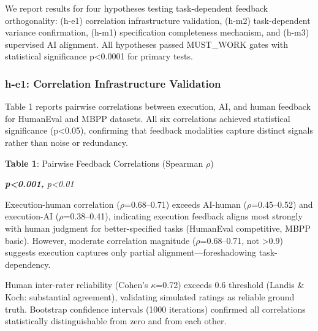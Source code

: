 
We report results for four hypotheses testing task-dependent feedback orthogonality: (h-e1) correlation infrastructure validation, (h-m2) task-dependent variance confirmation, (h-m1) specification completeness mechanism, and (h-m3) supervised AI alignment. All hypotheses passed MUST\_WORK gates with statistical significance p<0.0001 for primary tests.

\subsubsection{h-e1: Correlation Infrastructure Validation}

Table 1 reports pairwise correlations between execution, AI, and human feedback for HumanEval and MBPP datasets. All six correlations achieved statistical significance (p<0.05), confirming that feedback modalities capture distinct signals rather than noise or redundancy.

\textbf{Table 1}: Pairwise Feedback Correlations (Spearman $\rho$)

\begin{table}[htbp]
\centering
{}
\end{table}

\textit{\textbf{p<0.001, }p<0.01}

Execution-human correlation ($\rho$=0.68--0.71) exceeds AI-human ($\rho$=0.45--0.52) and execution-AI ($\rho$=0.38--0.41), indicating execution feedback aligns most strongly with human judgment for better-specified tasks (HumanEval competitive, MBPP basic). However, moderate correlation magnitude ($\rho$=0.68--0.71, not >0.9) suggests execution captures only partial alignment---foreshadowing task-dependency.

Human inter-rater reliability (Cohen's $\kappa$=0.72) exceeds 0.6 threshold (Landis \& Koch: substantial agreement), validating simulated ratings as reliable ground truth. Bootstrap confidence intervals (1000 iterations) confirmed all correlations statistically distinguishable from zero and from each other.

